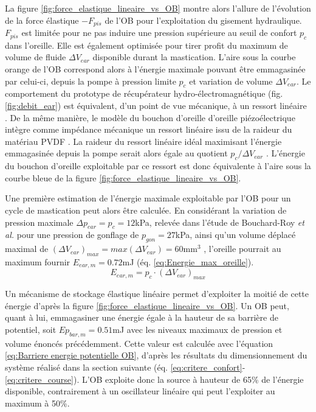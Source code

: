 La figure \ref{fig:force_elastique_lineaire_vs_OB} montre alors l'allure de l'évolution de la force élastique $-F_{pis}$ de l'OB pour l'exploitation du gisement hydraulique. $F_{pis}$ est limitée pour ne pas induire une pression supérieure au seuil de confort $p_c$ dans l'oreille. Elle est également optimisée pour tirer profit du maximum de volume de fluide $\Delta V_{ear}$ disponible durant la mastication. L'aire sous la courbe orange de l'OB correspond alors à l'énergie maximale pouvant être emmagasinée par celui-ci, depuis la pompe à pression limite $p_c$ et variation de volume $\Delta V_{ear}$. Le comportement du prototype de récupérateur hydro-électromagnétique (fig. \ref{fig:debit_ear}) est équivalent, d'un point de vue mécanique, à un ressort linéaire \cite{Delnavaz2014}. De la même manière, le modèle du bouchon d'oreille d'oreille piézoélectrique intègre comme impédance mécanique un ressort linéaire issu de la raideur du matériau PVDF \cite{Delnavaz2013}. La raideur du ressort linéaire idéal maximisant l'énergie emmagasinée depuis la pompe serait alors égale au quotient $p_c/\Delta V_{ear}$ . L'énergie du bouchon d'oreille exploitable par ce ressort est donc équivalente à l'aire sous la courbe bleue de la figure \ref{fig:force_elastique_lineaire_vs_OB}.

Une première estimation de l'énergie maximale exploitable par l'OB pour un cycle de mastication peut alors être calculée. En considérant la variation de pression maximale $\Delta p_{ear} = p_c = 12$kPa, relevée dans l'étude de Bouchard-Roy \emph{et al.} \cite{Bouchard-Roy2020} pour une pression de gonflage de $p_{gon} = 27$kPa, ainsi qu'un volume déplacé maximal de $(\Delta V_{ear})_{max} = max(\Delta V_{ear}) = 60$mm$^3$ \cite{Delnavaz2012}, l'oreille pourrait au maximum fournir $E_{ear,m} = 0.72$mJ (éq. \ref{eq:Energie_max_oreille}).
\begin{equation}
	E_{ear,m} = p_c \cdot (\Delta V_{ear})_{max}
	\label{eq:Energie_max_oreille}
\end{equation}

Un mécanisme de stockage élastique linéaire permet d'exploiter la moitié de cette énergie d'après la figure \ref{fig:force_elastique_lineaire_vs_OB}. Un OB peut, quant à lui, emmagasiner une énergie égale à la hauteur de sa barrière de potentiel, soit $Ep_{bar,m} = 0.51$mJ avec les niveaux maximaux de pression et volume énoncés précédemment. Cette valeur est calculée avec l'équation \ref{eq:Barriere energie potentielle OB}, d'après les résultats du dimensionnement du système réalisé dans la section suivante (éq. \ref{eq:critere_confort}-\ref{eq:critere_course}). L'OB exploite donc la source à hauteur de 65\% de l'énergie disponible, contrairement à un oscillateur linéaire qui peut l'exploiter au maximum à 50\%.

